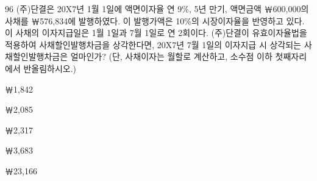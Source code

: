 \begin{question}{96}
(주)단결은 20X7년 1월 1일에 액면이자율 연 9\%, 5년 만기, 액면금액 ￦600,000의 사채를 ￦576,834에 발행하였다. 이 발행가액은 10\%의 시장이자율을 반영하고 있다. 이 사채의 이자지급일은 1월 1일과 7월 1일로 연 2회이다. (주)단결이 유효이자율법을 적용하여 사채할인발행차금을 상각한다면, 20X7년 7월 1일의 이자지급 시 상각되는 사채할인발행차금은 얼마인가? (단, 사채이자는 월할로 계산하고, 소수점 이하 첫째자리에서 반올림하시오.)
\begin{choices}
  \item ￦1,842
  \item ￦2,085
  \item ￦2,317
  \item ￦3,683
  \item ￦23,166
\end{choices}
\end{question}
